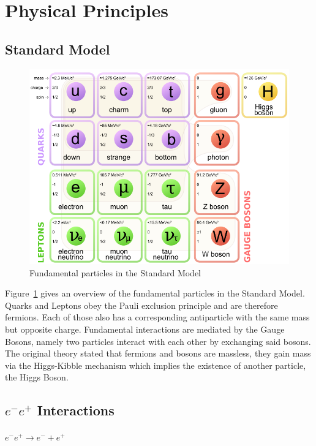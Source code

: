 
\section{Physical Principles}
\subsection{Standard Model}
\begin{figure}[hb]
	\centering
	\includegraphics[scale=0.25]{graphics/Standard_Model_of_Elementary_Particles.png}
	\caption{Fundamental particles in the Standard Model}
	\label{fig:principles:Standard_Model_of_Elementary_Particles}
\end{figure}

Figure~\ref{fig:principles:Standard_Model_of_Elementary_Particles} gives an overview of the fundamental particles in the Standard Model. Quarks and Leptons obey the Pauli exclusion principle and are therefore fermions. Each of those also has a corresponding antiparticle with the same mass but opposite charge. Fundamental interactions are mediated by the Gauge Bosons, namely two particles interact with each other by exchanging said bosons. The original theory stated that fermions and bosons are massless, they gain mass via the Higgs-Kibble mechanism which implies the existence of another particle, the Higgs Boson.

\subsection{$e^-e^+$ Interactions}
\paragraph{$e^-e^+ \rightarrow e^- + e^+$}

